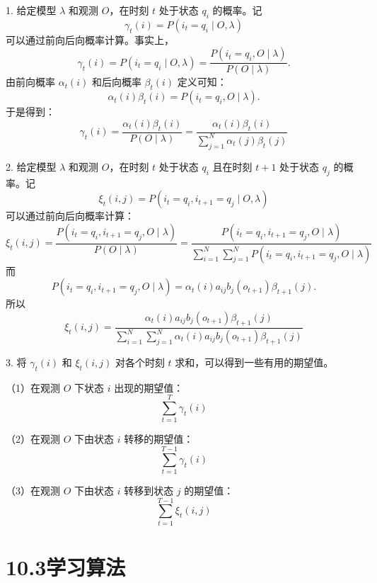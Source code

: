 \documentclass[UTF8, 12pt, fontset=fandol, oneside]{ctexart}
\begin{document}
1. 给定模型 $\lambda$ 和观测 $O$，在时刻 $t$ 处于状态 $q_i$ 的概率。记
\begin{equation}
  \gamma_t(i)=P(i_t=q_i\mid O,\lambda)
  \tag{10.23}
\end{equation}
可以通过前向后向概率计算。事实上，
\[
  \gamma_t(i)=P(i_t=q_i\mid O,\lambda)=\frac{P(i_t=q_i,O\mid\lambda)}{P(O\mid\lambda)}.
\]
由前向概率 $\alpha_t(i)$ 和后向概率 $\beta_t(i)$ 定义可知：
\[
  \alpha_t(i)\beta_t(i)=P(i_t=q_i,O\mid\lambda).
\]
于是得到：
\begin{equation}
  \gamma_t(i)=\frac{\alpha_t(i)\beta_t(i)}{P(O\mid\lambda)}
  =\frac{\alpha_t(i)\beta_t(i)}{\sum_{j=1}^N\alpha_t(j)\beta_t(j)}
  \tag{10.24}
\end{equation}

2. 给定模型 $\lambda$ 和观测 $O$，在时刻 $t$ 处于状态 $q_i$ 且在时刻 $t+1$ 处于状态 $q_j$ 的概率。记
\begin{equation}
  \xi_t(i,j)=P(i_t=q_i,i_{t+1}=q_j\mid O,\lambda)
  \tag{10.25}
\end{equation}
可以通过前向后向概率计算：
\[
  \xi_t(i,j)=\frac{P(i_t=q_i,i_{t+1}=q_j,O\mid\lambda)}{P(O\mid\lambda)}
  =\frac{P(i_t=q_i,i_{t+1}=q_j,O\mid\lambda)}
  {\sum_{i=1}^N\sum_{j=1}^N P(i_t=q_i,i_{t+1}=q_j,O\mid\lambda)}
\]
而
\[
  P(i_t=q_i,i_{t+1}=q_j,O\mid\lambda)=\alpha_t(i)a_{ij}b_j(o_{t+1})\beta_{t+1}(j).
\]
所以
\begin{equation}
  \xi_t(i,j)=
  \frac{\alpha_t(i)a_{ij}b_j(o_{t+1})\beta_{t+1}(j)}
  {\sum_{i=1}^N\sum_{j=1}^N\alpha_t(i)a_{ij}b_j(o_{t+1})\beta_{t+1}(j)}
  \tag{10.26}
\end{equation}

3. 将 $\gamma_t(i)$ 和 $\xi_t(i,j)$ 对各个时刻 $t$ 求和，可以得到一些有用的期望值。

（1）在观测 $O$ 下状态 $i$ 出现的期望值：
\begin{equation}
  \sum_{t=1}^T \gamma_t(i)
  \tag{10.27}
\end{equation}

（2）在观测 $O$ 下由状态 $i$ 转移的期望值：
\begin{equation}
  \sum_{t=1}^{T-1}\gamma_t(i)
  \tag{10.28}
\end{equation}

（3）在观测 $O$ 下由状态 $i$ 转移到状态 $j$ 的期望值：
\begin{equation}
  \sum_{t=1}^{T-1}\xi_t(i,j)
  \tag{10.29}
\end{equation}

\section*{10.3\quad 学习算法}
\end{document}
